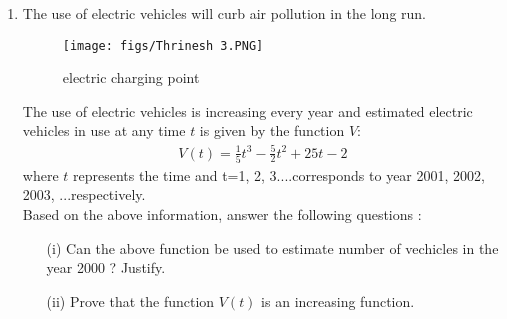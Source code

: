 \documentclass{article}
\begin{document}
\begin{enumerate}
\item The use of electric vehicles will curb air pollution in the long run.\\
\begin{figure}[H]
\centering
	\texttt{[image: figs/Thrinesh 3.PNG]}
	\caption{electric charging point}
\label{fig}
\end{figure}
The use of electric vehicles is increasing every year and estimated electric vehicles in use at any time \(t\) is given by the function \(V\):\\
		\begin{align}
		V(t)=\frac{1}{5} t^3-\frac{5}{2}t^2+25t-2
		\end{align}
where \(t\) represents the time and t=1, 2, 3....corresponds to year 2001, 2002, 2003, ...respectively.\\
Based on the above information, answer the following questions :
\begin{itemize}
    \item [(i)] Can the above function be used to estimate number of vechicles in the year 2000 ? Justify.
    \item [(ii)] Prove that the function \(V(t)\) is an increasing function.
    \end{itemize}
\end{enumerate}
\end{document}
